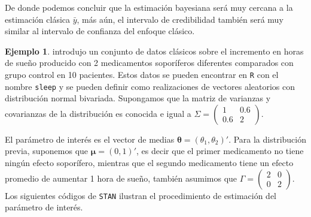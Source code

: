 \documentclass[
  10pt,
  spanish,
]{book}
\theoremstyle{definition}
\theoremstyle{definition}
\newtheorem{example}{Ejemplo}[chapter]
\theoremstyle{definition}
\theoremstyle{definition}
\theoremstyle{remark}
\begin{document}
De donde podemos concluir que la estimación bayesiana será muy cercana a la estimación clásica \(\bar{y}\), más aún, el intervalo de credibilidad también será muy similar al intervalo de confianza del enfoque clásico.

\begin{example}
\protect\hypertarget{exm:unnamed-chunk-27}{}{\label{exm:unnamed-chunk-27} }\citet{Student} introdujo un conjunto de datos clásicos sobre el incremento en horas de sueño producido con 2 medicamentos soporíferos diferentes comparados con grupo control en 10 pacientes. Estos datos se pueden encontrar en \texttt{R} con el nombre \texttt{sleep} y se pueden definir como realizaciones de vectores aleatorios con distribución normal bivariada. Supongamos que la matriz de varianzas y covarianzas de la distribución es conocida e igual a \(\Sigma=\begin{pmatrix}1&0.6\\ 0.6&2\end{pmatrix}\).

El parámetro de interés es el vector de medias \(\boldsymbol \theta=(\theta_1,\theta_2)'\). Para la distribución previa, suponemos que \(\boldsymbol \mu=(0,1)'\), es decir que el primer medicamento no tiene ningún efecto soporífero, mientras que el segundo medicamento tiene un efecto promedio de aumentar 1 hora de sueño, también asumimos que \(\Gamma=\begin{pmatrix}2&0\\ 0&2\end{pmatrix}\). Los siguientes códigos de \texttt{STAN} ilustran el procedimiento de estimación del parámetro de interés.
\end{example}
\end{document}
